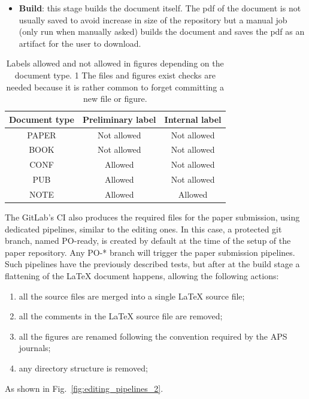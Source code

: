 \begin{itemize}
\item \textbf{Build}: this stage builds the document itself. The pdf of the document is not usually saved to avoid increase in size of the repository but a manual job (only run when manually asked) builds the document and saves the pdf as an artifact for the user to download.
\end{itemize}
\begin{table}[ht!]
\centering
\begin{tabular}{|c|c|c|}\hline
   Document type & Preliminary label & Internal label \\
  \hline\hline
   PAPER & Not allowed & Not allowed \\
  \hline
    BOOK & Not allowed & Not allowed \\
  \hline
    CONF & Allowed & Not allowed \\
  \hline
    PUB & Allowed & Not allowed \\
  \hline
    NOTE & Allowed & Allowed \\
  \hline \hline
\end{tabular}
\caption{\label{tab1}Labels allowed and not allowed in figures depending on the document type.
1 The files and figures exist checks are needed because it is rather common to forget committing a new file or figure.}
\end{table}

The GitLab’s CI also produces the required files for the paper submission, using dedicated pipelines, similar to the editing ones. In this case, a protected git branch, named PO-ready, is created by default at the time of the setup of the paper repository. Any PO-* branch will trigger the paper submission pipelines. Such pipelines have the previously described tests, but after at the build stage a flattening of the LaTeX document happens, allowing the following actions:

\begin{enumerate}
\item all the source files are merged into a single LaTeX source file;
\item all the comments in the LaTeX source file are removed;
\item all the figures are renamed following the convention required by the APS journals;
\item any directory structure is removed;
\end{enumerate}
As shown in Fig.~\ref{fig:editing_pipelines_2}.

